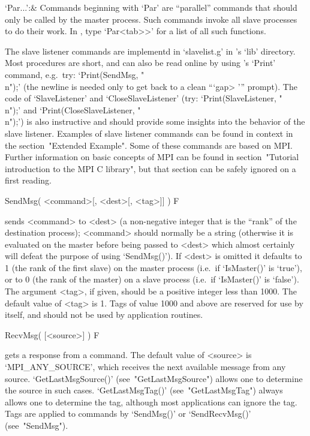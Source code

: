 `Par...':&
Commands beginning with `Par' are ``parallel'' commands that should  only
be called by the master process. Such commands invoke all slave processes
to do their work. In {\ParGAP}, type `Par\<<tab>>' for a list of all such
functions.

\enditems


The  slave  listener  commands  are  implementd   in   `slavelist.g'   in
{\ParGAP}'s `lib' directory. Most procedures are short, and can  also  be
read online by using {\GAP}'s `Print' command, e.g.~try:  `Print(SendMsg,
"\\n");' (the newline is needed only to get back to a  clean  ```gap> '''
prompt). The  code  of  `SlaveListener'  and  `CloseSlaveListener'  (try:
`Print(SlaveListener, "\\n");' and  `Print(CloseSlaveListener,  "\\n");')
is also instructive and should provide some insights into the behavior of
the slave listener. Examples of slave listener commands can be  found  in
context in the section~"Extended Example". Some  of  these  commands  are
based on MPI. Further information on basic concepts of MPI can  be  found
in section~"Tutorial introduction to the MPI C library", but that section
can be safely ignored on a first reading.

\>SendMsg( <command>[, <dest>[, <tag>]] ) F

sends <command> to <dest> (a non-negative integer that is the ``rank'' of
the  destination  process);  <command>  should  normally  be   a   string
(otherwise it is evaluated on the master before being  passed  to  <dest>
which almost certainly will defeat the purpose of using `SendMsg()').  If
<dest> is omitted it defaults to 1 (the rank of the first slave)  on  the
master process (i.e.~if `IsMaster()' is `true'), or to 0 (the rank of the
master) on  a  slave  process  (i.e.~if  `IsMaster()'  is  `false').  The
argument <tag>, if given, should be a positive integer  less  than  1000.
The default value of <tag> is  1.  Tags  of  value  1000  and  above  are
reserved for  use  by  {\ParGAP}  itself,  and  should  not  be  used  by
application routines.

\>RecvMsg( [<source>] ) F

gets a response  from  a  command.  The  default  value  of  <source>  is
`MPI_ANY_SOURCE', which receives the  next  available  message  from  any
source.  `GetLastMsgSource()'  (see~"GetLastMsgSource")  allows  one   to
determine    the    source    in    such     cases.     `GetLastMsgTag()'
(see~"GetLastMsgTag") always allows one to determine  the  tag,  although
most applications can ignore the tag. Tags are  applied  to  commands  by
`SendMsg()' or `SendRecvMsg()' (see~"SendMsg").


